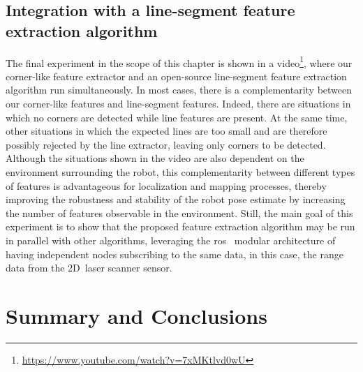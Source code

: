 \subsection{Integration with a line-segment feature extraction algorithm}

The final experiment in the scope of this chapter is shown in a
video\footnote{\url{https://www.youtube.com/watch?v=7xMKtlvd0wU}},
where our corner-like feature extractor and an open-source line-segment
feature extraction algorithm
run simultaneously. In most cases, there is a complementarity
between our corner-like features and line-segment features.
Indeed, there are situations in which no corners are detected
while line features are present. At the same time, other situations
in which the expected lines are too small and are therefore possibly rejected
by the line extractor, leaving only corners to be detected.
Although the situations shown in the video are also dependent
on the environment surrounding the robot, this complementarity
between different types of features is advantageous
for localization and mapping processes,
thereby improving the robustness and stability of the robot pose
estimate by increasing the number of features observable in the environment.
Still, the main goal of this experiment is to show that
the proposed feature extraction algorithm may be run in parallel
with other algorithms, leveraging the \gls{ros}~\cite{ros} modular architecture
of having independent nodes subscribing to the same data, in this case,
the range data from the 2D~laser scanner sensor.

\section{Summary and Conclusions}\label{sec:features:conclusions}

